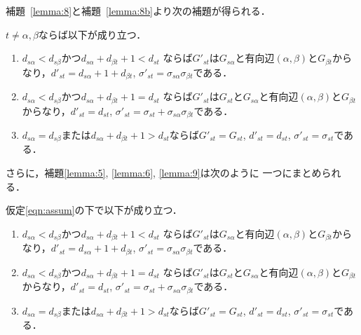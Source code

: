 補題~\ref{lemma:8}と補題~\ref{lemma:8b}より次の補題が得られる．
\begin{lemma}
$t \neq \alpha, \beta$ならば以下が成り立つ．
\begin{enumerate}
\item $d_{s\alpha}<d_{s\beta}$かつ$d_{s\alpha}+d_{\beta t}+1<d_{st}$
ならば$G'_{st}$は$G_{s\alpha}$と有向辺$(\alpha,\beta)$と$G_{\beta t}$からなり，$d'_{st}=d_{s\alpha}+1+d_{\beta t}$, $\sigma'_{st}=\sigma_{s\alpha}\sigma_{\beta t}$である．
\item $d_{s\alpha}<d_{s\beta}$かつ$d_{s\alpha}+d_{\beta t}+1=d_{st}$
ならば$G'_{st}$は$G_{st}$と$G_{s\alpha}$と有向辺$(\alpha,\beta)$と$G_{\beta t}$からなり，$d'_{st}=d_{st}$, $\sigma'_{st}=\sigma_{st}+\sigma_{s\alpha}\sigma_{\beta t}$である．
\item $d_{s\alpha}=d_{s\beta}$または$d_{s\alpha}+d_{\beta t}+1>d_{st}$ならば$G'_{st}=G_{st}$, $d'_{st}=d_{st}$, $\sigma'_{st}=\sigma_{st}$である．
\end{enumerate}
\label{lemma:9}
\end{lemma}

さらに，補題\ref{lemma:5}, \ref{lemma:6}, \ref{lemma:9}は次のように
一つにまとめられる．

\begin{theorem}
仮定\eqref{eqn:assum}の下で以下が成り立つ．
\begin{enumerate}
\item $d_{s\alpha}<d_{s\beta}$かつ$d_{s\alpha}+d_{\beta t}+1<d_{st}$
ならば$G'_{st}$は$G_{s\alpha}$と有向辺$(\alpha,\beta)$と$G_{\beta t}$からなり，$d'_{st}=d_{s\alpha}+1+d_{\beta t}$, $\sigma'_{st}=\sigma_{s\alpha}\sigma_{\beta t}$である．
\item $d_{s\alpha}<d_{s\beta}$かつ$d_{s\alpha}+d_{\beta t}+1=d_{st}$
ならば$G'_{st}$は$G_{st}$と$G_{s\alpha}$と有向辺$(\alpha,\beta)$と$G_{\beta t}$からなり，$d'_{st}=d_{st}$, $\sigma'_{st}=\sigma_{st}+\sigma_{s\alpha}\sigma_{\beta t}$である．
\item $d_{s\alpha}=d_{s\beta}$または$d_{s\alpha}+d_{\beta t}+1>d_{st}$ならば$G'_{st}=G_{st}$, $d'_{st}=d_{st}$, $\sigma'_{st}=\sigma_{st}$である．
\end{enumerate}
\label{theorem:1}
\end{theorem}

